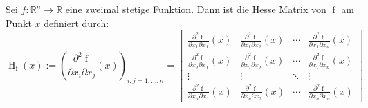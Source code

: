 Sei $f : \mathbb{R}^n \to \mathbb{R}$ eine zweimal stetige Funktion. Dann ist die Hesse Matrix von $\operatorname{f}$ am Punkt $x$ definiert durch:
$$\operatorname{H}_{\operatorname{f}}(x):=
\left(\frac{\partial^2\operatorname{f}}{\partial x_i\partial x_j}(x)\right)_{i,j=1,\dots, n}=
\begin{bmatrix}
	\frac{\partial^2 \operatorname{f}}{\partial x_1\partial x_1}(x)&\frac{\partial^2 \operatorname{f}}{\partial x_1\partial x_2}(x)&\cdots&\frac{\partial^2  \operatorname{f}}{\partial x_1\partial x_n}(x)\\[0.5em]
	\frac{\partial^2 \operatorname{f}}{\partial x_2\partial x_1}(x)&\frac{\partial^2 \operatorname{f}}{\partial x_2\partial x_2}(x)&\cdots&\frac{\partial^2  \operatorname{f}}{\partial x_2\partial x_n}(x)\\
	\vdots&\vdots&\ddots&\vdots\\
	\frac{\partial^2 \operatorname{f}}{\partial x_n\partial x_1}(x)&\frac{\partial^2 \operatorname{f}}{\partial x_n\partial x_2}(x)&\cdots&\frac{\partial^2  \operatorname{f}}{\partial x_n\partial x_n}(x)
\end{bmatrix}$$
